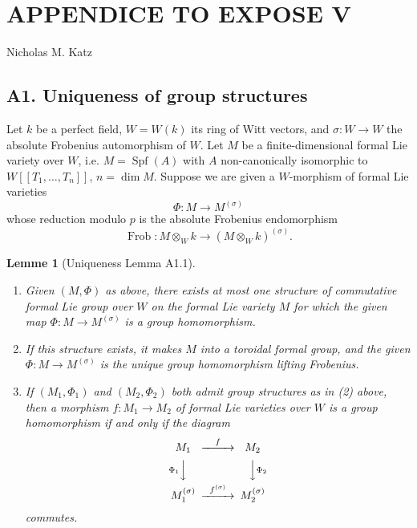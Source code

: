 \documentclass[12pt,a4paper]{article}
\theoremstyle{plain}
\newtheorem{lemma}[theorem]{Lemme}
\theoremstyle{definition}
\theoremstyle{remark}
\DeclareMathOperator{\Spf}{Spf}
\DeclareMathOperator{\Frob}{Frob}
\begin{document}
\newpage

\section*{APPENDICE TO EXPOSE V}

\begin{center}
Nicholas M. Katz
\end{center}

\subsection*{A1. Uniqueness of group structures}

Let $k$ be a perfect field, $W = W(k)$ its ring of Witt vectors, and $\sigma : W \to W$ the absolute Frobenius automorphism of $W$. Let $M$ be a finite-dimensional formal Lie variety over $W$, i.e. $M = \Spf(A)$ with $A$ non-canonically isomorphic to $W[[T_1, \ldots, T_n]]$, $n = \dim M$. Suppose we are given a $W$-morphism of formal Lie varieties
\[
\Phi : M \longrightarrow M^{(\sigma)}
\]
whose reduction modulo $p$ is the absolute Frobenius endomorphism
\[
\Frob : M \otimes_W k \longrightarrow (M \otimes_W k)^{(\sigma)}.
\]

\begin{lemma}[Uniqueness Lemma A1.1]\ \begin{enumerate}[label=(\arabic*)]
\item Given $(M, \Phi)$ as above, there exists at most one structure of commutative formal Lie group over $W$ on the formal Lie variety $M$ for which the given map $\Phi : M \to M^{(\sigma)}$ is a group homomorphism.
\item If this structure exists, it makes $M$ into a toroidal formal group, and the given $\Phi : M \to M^{(\sigma)}$ is the unique group homomorphism lifting Frobenius.
\item If $(M_1, \Phi_1)$ and $(M_2, \Phi_2)$ both admit group structures as in (2) above, then a morphism $f : M_1 \to M_2$ of formal Lie varieties over $W$ is a group homomorphism if and only if the diagram
\[
\begin{CD}
M_1 @>{f}>> M_2 \\
@V{\Phi_1}VV @VV{\Phi_2}V \\
M_1^{(\sigma)} @>{f^{(\sigma)}}>> M_2^{(\sigma)}
\end{CD}
\]
commutes.
\end{enumerate}
\end{lemma}
\end{document}
